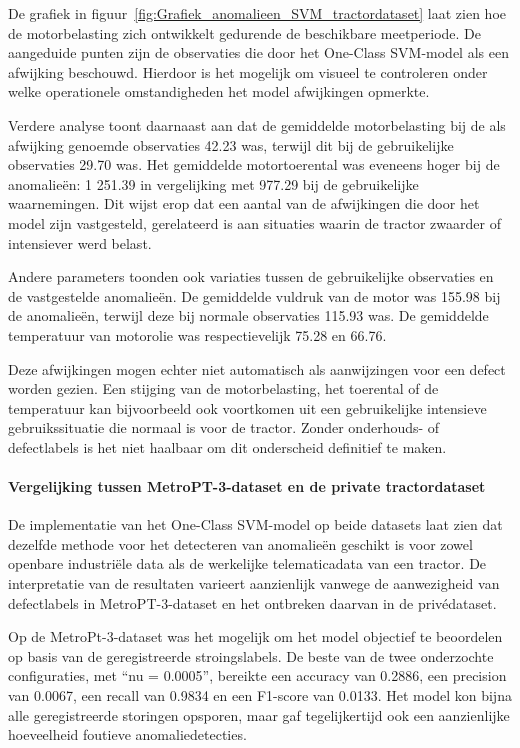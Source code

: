 {{{{{De grafiek in figuur~\ref{fig:Grafiek_anomalieen_SVM_tractordataset} laat zien hoe de motorbelasting zich ontwikkelt gedurende de beschikbare meetperiode. De aangeduide punten zijn de observaties die door het One-Class SVM-model als een afwijking beschouwd. Hierdoor is het mogelijk om visueel te controleren onder welke operationele omstandigheden het model afwijkingen opmerkte.

Verdere analyse toont daarnaast aan dat de gemiddelde motorbelasting bij de als afwijking genoemde observaties 42.23 was, terwijl dit bij de gebruikelijke observaties 29.70 was. Het gemiddelde motortoerental was eveneens hoger bij de anomalieën: 1 251.39 in vergelijking met 977.29 bij de gebruikelijke waarnemingen. Dit wijst erop dat een aantal van de afwijkingen die door het model zijn vastgesteld, gerelateerd is aan situaties waarin de tractor zwaarder of intensiever werd belast.

Andere parameters toonden ook variaties tussen de gebruikelijke observaties en de vastgestelde anomalieën. De gemiddelde vuldruk van de motor was 155.98 bij de anomalieën, terwijl deze bij normale observaties 115.93 was. De gemiddelde temperatuur van motorolie was respectievelijk 75.28 en 66.76.

Deze afwijkingen mogen echter niet automatisch als aanwijzingen voor een defect worden gezien. Een stijging van de motorbelasting, het toerental of de temperatuur kan bijvoorbeeld ook voortkomen uit een gebruikelijke intensieve gebruikssituatie die normaal is voor de tractor. Zonder onderhouds- of defectlabels is het niet haalbaar om dit onderscheid definitief te maken.

\paragraph{Vergelijking tussen MetroPT-3-dataset en de private tractordataset}

De implementatie van het One-Class SVM-model op beide datasets laat zien dat dezelfde methode voor het detecteren van anomalieën geschikt is voor zowel openbare industriële data als de werkelijke telematicadata van een tractor. De interpretatie van de resultaten varieert aanzienlijk vanwege de aanwezigheid van defectlabels in MetroPT-3-dataset en het ontbreken daarvan in de privédataset.

Op de MetroPt-3-dataset was het mogelijk om het model objectief te beoordelen op basis van de geregistreerde stroingslabels. De beste van de twee onderzochte configuraties, met ``nu = 0.0005'', bereikte een accuracy van 0.2886, een precision van 0.0067, een recall van 0.9834 en een F1-score van 0.0133. Het model kon bijna alle geregistreerde storingen opsporen, maar gaf tegelijkertijd ook een aanzienlijke hoeveelheid foutieve anomaliedetecties.

}}}}}
